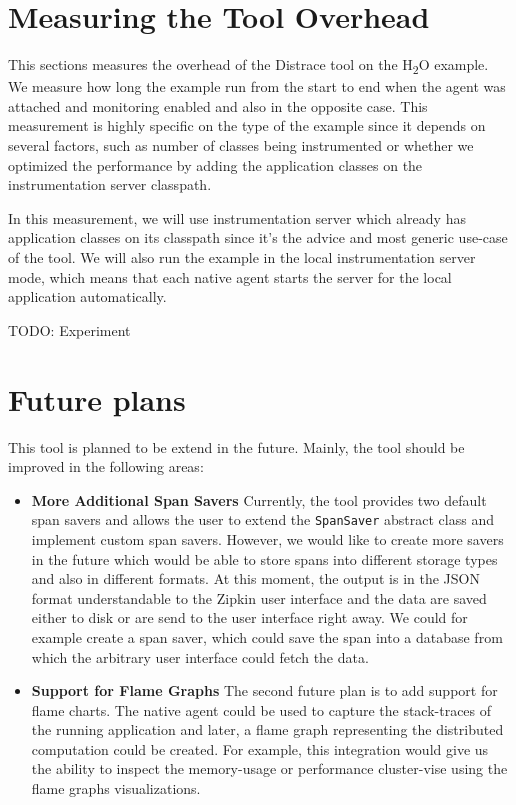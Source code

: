 \section{Measuring the Tool Overhead}
This sections measures the overhead of the Distrace tool on the H\textsubscript{2}O example. We measure how long the example run from the start to end when the agent was attached and monitoring enabled and also in the opposite case. This measurement is highly specific on the type of the example since it depends on several factors, such as number of classes being instrumented or whether we optimized the performance by adding the application classes on the instrumentation server classpath.

In this measurement, we will use instrumentation server which already has application classes on its classpath since it's the advice and most generic use-case of the tool. We will also run  the example in the local instrumentation server mode, which means that each native agent starts the server for the local application automatically.


TODO: Experiment
\section{Future plans}
This tool is planned to be extend in the future. Mainly, the tool should be improved in the following areas:
\begin{itemize}
\item \textbf{More Additional Span Savers} \newline
Currently, the tool provides two default span savers and allows the user to extend the \texttt{SpanSaver} abstract class and implement custom span savers. However, we would like to create more savers in the future which would be able to store spans into different storage types and also in different formats. At this moment, the output is in the JSON format understandable to the Zipkin user interface and the data are saved either to disk or are send to the user interface right away. We could for example create a span saver, which could save the span into a database from which the arbitrary user interface could fetch the data.
\item \textbf{Support for Flame Graphs} \newline
The second future plan is to add support for flame charts. The native agent could be used to capture the stack-traces of the running application and later, a flame graph representing the distributed computation could be created. For example, this integration would give us the ability to inspect the memory-usage or performance cluster-vise using the flame graphs visualizations.
\end{itemize}



